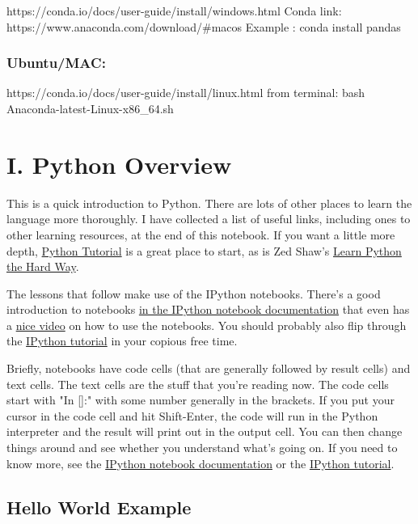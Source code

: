 \documentclass[11pt]{article}
\begin{document}
https://conda.io/docs/user-guide/install/windows.html Conda link:
https://www.anaconda.com/download/\#macos Example : conda install pandas

\subsubsection{Ubuntu/MAC:}\label{ubuntumac}

https://conda.io/docs/user-guide/install/linux.html from terminal: bash
Anaconda-latest-Linux-x86\_64.sh 

    \section{I. Python Overview}\label{i.-python-overview}

This is a quick introduction to Python. There are lots of other places
to learn the language more thoroughly. I have collected a list of useful
links, including ones to other learning resources, at the end of this
notebook. If you want a little more depth,
\href{http://docs.python.org/2/tutorial/}{Python Tutorial} is a great
place to start, as is Zed Shaw's
\href{http://learnpythonthehardway.org/book/}{Learn Python the Hard
Way}.

The lessons that follow make use of the IPython notebooks. There's a
good introduction to notebooks
\href{http://ipython.org/notebook.html}{in the IPython notebook
documentation} that even has a
\href{http://www.youtube.com/watch?v=H6dLGQw9yFQ\#!}{nice video} on how
to use the notebooks. You should probably also flip through the
\href{http://ipython.org/ipython-doc/dev/interactive/tutorial.html}{IPython
tutorial} in your copious free time.

Briefly, notebooks have code cells (that are generally followed by
result cells) and text cells. The text cells are the stuff that you're
reading now. The code cells start with "In {[}{]}:" with some number
generally in the brackets. If you put your cursor in the code cell and
hit Shift-Enter, the code will run in the Python interpreter and the
result will print out in the output cell. You can then change things
around and see whether you understand what's going on. If you need to
know more, see the \href{http://ipython.org/notebook.html}{IPython
notebook documentation} or the
\href{http://ipython.org/ipython-doc/dev/interactive/tutorial.html}{IPython
tutorial}.

    \subsection{Hello World Example}\label{hello-world-example}
\end{document}
